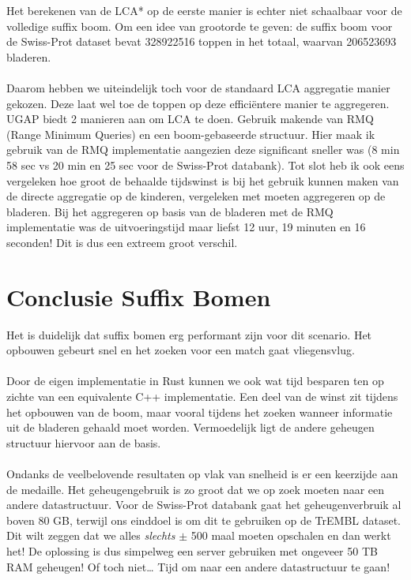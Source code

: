 Het berekenen van de LCA* op de eerste manier is echter niet schaalbaar voor de volledige suffix boom.
Om een idee van grootorde te geven: de suffix boom voor de Swiss-Prot dataset bevat 328922516 toppen in het totaal, waarvan 206523693 bladeren.
\\ \\
Daarom hebben we uiteindelijk toch voor de standaard LCA aggregatie manier gekozen.
Deze laat wel toe de toppen op deze efficiëntere manier te aggregeren.
UGAP biedt 2 manieren aan om LCA te doen.
Gebruik makende van RMQ (Range Minimum Queries) en een boom-gebaseerde structuur.
Hier maak ik gebruik van de RMQ implementatie aangezien deze significant sneller was (8 min 58 sec vs 20 min en 25 sec voor de Swiss-Prot databank).
Tot slot heb ik ook eens vergeleken hoe groot de behaalde tijdswinst is bij het gebruik kunnen maken van de directe aggregatie op de kinderen, vergeleken met moeten aggregeren op de bladeren.
Bij het aggregeren op basis van de bladeren met de RMQ implementatie was de uitvoeringstijd maar liefst 12 uur, 19 minuten en 16 seconden!
Dit is dus een extreem groot verschil.

\section{Conclusie Suffix Bomen}\label{sec:conclusie-suffix-bomen}
Het is duidelijk dat suffix bomen erg performant zijn voor dit scenario.
Het opbouwen gebeurt snel en het zoeken voor een match gaat vliegensvlug.
\\ \\
Door de eigen implementatie in Rust kunnen we ook wat tijd besparen ten op zichte van een equivalente C++ implementatie.
Een deel van de winst zit tijdens het opbouwen van de boom, maar vooral tijdens het zoeken wanneer informatie uit de bladeren gehaald moet worden.
Vermoedelijk ligt de andere geheugen structuur hiervoor aan de basis.
\\ \\
Ondanks de veelbelovende resultaten op vlak van snelheid is er een keerzijde aan de medaille.
Het geheugengebruik is zo groot dat we op zoek moeten naar een andere datastructuur.
Voor de Swiss-Prot databank gaat het geheugenverbruik al boven 80 GB, terwijl ons einddoel is om dit te gebruiken op de TrEMBL dataset.
Dit wilt zeggen dat we alles \textit{slechts} $\pm$ 500 maal moeten opschalen en dan werkt het!
De oplossing is dus simpelweg een server gebruiken met ongeveer 50 TB RAM geheugen!
Of toch niet\ldots
Tijd om naar een andere datastructuur te gaan!
